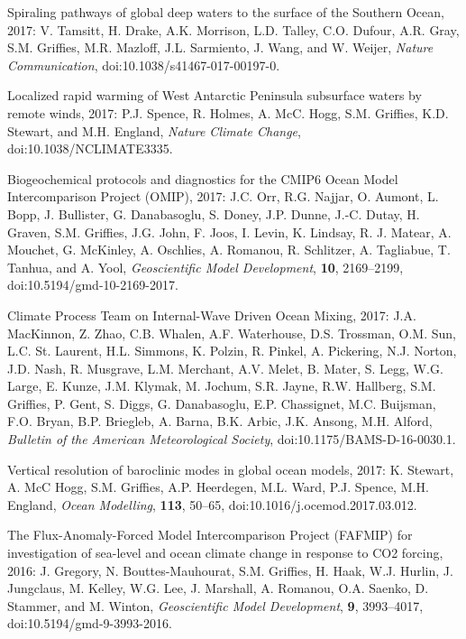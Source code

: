 \begin{etaremune}
\item Spiraling pathways of global deep waters to the surface of the Southern Ocean, 2017: V. Tamsitt, H.  Drake, A.K. Morrison, L.D. Talley, C.O. Dufour, A.R. Gray, S.M. Grif\/f\/ies, M.R. Mazloff, J.L. Sarmiento, J. Wang, and W. Weijer, {\it Nature Communication}, doi:10.1038/s41467-017-00197-0.

\item Localized rapid warming of West Antarctic Peninsula subsurface waters by remote winds, 2017: P.J. Spence, R. Holmes, A. McC. Hogg,   S.M. Grif\/f\/ies, K.D. Stewart, and M.H. England, {\it Nature Climate Change}, doi:10.1038/NCLIMATE3335.

\item Biogeochemical protocols and diagnostics for the CMIP6 Ocean Model Intercomparison Project (OMIP), 2017: J.C. Orr, R.G. Najjar, O. Aumont, L.  Bopp, J. Bullister, G. Danabasoglu, S. Doney,  J.P. Dunne, J.-C. Dutay, H. Graven, S.M. Grif\/f\/ies, J.G. John, F. Joos, I. Levin, K. Lindsay, R. J. Matear, A. Mouchet, G. McKinley, A. Oschlies, A. Romanou, R. Schlitzer, A. Tagliabue, T. Tanhua, and A. Yool, {\it Geoscientific Model Development}, {\bf 10}, 2169--2199, doi:10.5194/gmd-10-2169-2017.

\item Climate Process Team on Internal-Wave Driven Ocean Mixing, 2017:  J.A. MacKinnon, Z. Zhao, C.B. Whalen, A.F. Waterhouse, D.S. Trossman, O.M. Sun, L.C. St. Laurent, H.L. Simmons, K. Polzin, R. Pinkel, A. Pickering, N.J. Norton, J.D. Nash, R. Musgrave, L.M. Merchant, A.V. Melet, B. Mater, S. Legg, W.G. Large, E. Kunze, J.M. Klymak,  M. Jochum, S.R. Jayne, R.W. Hallberg, S.M. Grif\/f\/ies, P. Gent, S. Diggs, G. Danabasoglu, E.P. Chassignet, M.C. Buijsman, F.O. Bryan, B.P. Briegleb, A. Barna, B.K. Arbic,  J.K. Ansong, M.H. Alford, {\it Bulletin of the American Meteorological Society}, doi:10.1175/BAMS-D-16-0030.1.

\item Vertical resolution of baroclinic modes in global ocean models,  2017: K. Stewart, A. McC Hogg, S.M. Grif\/f\/ies, A.P. Heerdegen, M.L. Ward, P.J. Spence, M.H. England,  {\it Ocean Modelling}, {\bf 113}, 50--65, doi:10.1016/j.ocemod.2017.03.012.

\item The Flux-Anomaly-Forced Model Intercomparison Project (FAFMIP) for investigation of sea-level and ocean climate change in response to CO2 forcing, 2016: J. Gregory, N. Bouttes-Mauhourat, S.M. Grif\/f\/ies, H. Haak, W.J. Hurlin, J.  Jungclaus, M. Kelley, W.G. Lee, J. Marshall, A. Romanou, O.A. Saenko, D. Stammer, and M.  Winton, {\it Geoscientific Model Development},
  {\bf 9}, 3993--4017, doi:10.5194/gmd-9-3993-2016.






\end{etaremune}
